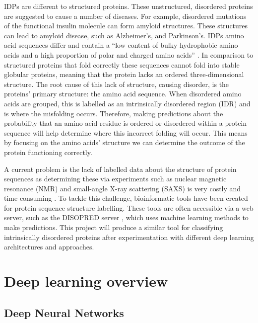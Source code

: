 \documentclass{l4proj}
\begin{document}
IDPs are different to structured proteins. These unstructured, disordered proteins are suggested to cause a number of diseases. For example, disordered mutations of the functional insulin molecule can form amyloid structures. These structures can lead to amyloid disease, such as Alzheimer's, and Parkinson's. IDPs amino acid sequences differ and contain a “low content of bulky hydrophobic amino acids and a high proportion of polar and charged amino acids” \citep{idp:wiki}. In comparison to structured proteins that fold correctly these sequences cannot fold into stable globular proteins, meaning that the protein lacks an ordered three-dimensional structure. The root cause of this lack of structure, causing disorder, is the proteins’ primary structure: the amino acid sequence. When disordered amino acids are grouped, this is labelled as an intrinsically disordered region (IDR) and is where the misfolding occurs. Therefore, making predictions about the probability that an amino acid residue is ordered or disordered within a protein sequence will help determine where this incorrect folding will occur. This means by focusing on the amino acids’ structure we can determine the outcome of the protein functioning correctly. 

A current problem is the lack of labelled data about the structure of protein sequences as determining these via experiments such as nuclear magnetic resonance (NMR) and small-angle X-ray scattering (SAXS) is very costly and time-consuming \citep{Alshehri:20}. To tackle this challenge, bioinformatic tools have been created for protein sequence structure labelling. These tools are often accessible via a web server, such as the DISOPRED server \citep{Jones:15}, which uses machine learning methods to make predictions. This project will produce a similar tool for classifying intrinsically disordered proteins after experimentation with different deep learning architectures and approaches.

\section{Deep learning overview}

\subsection{Deep Neural Networks}
\end{document}
